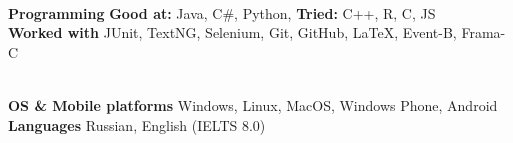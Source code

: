 


\vspace{.2cm}\begin{minipage}{.45\textwidth}
	\\{\fontsize{7pt}{1em}\bodyfont\bfseries\color{darktext}Programming}  {\fontsize{7pt}{1em}\bodyfontlight\color{text}\textbf{Good at:} Java, C\#, Python, \textbf{Tried:} C++, R, C, JS}
	\\{\fontsize{7pt}{1em}\bodyfont\bfseries\color{darktext}Worked with}  {\fontsize{7pt}{1em}\bodyfontlight\color{text}JUnit, TextNG, Selenium, Git, GitHub, LaTeX, Event-B, Frama-C}
\end{minipage} \quad
\begin{minipage}{.45\textwidth}
	\\{\fontsize{7pt}{1em}\bodyfont\bfseries\color{darktext}OS \& Mobile platforms}  {\fontsize{7pt}{1em}\bodyfontlight\color{text}Windows, Linux, MacOS, Windows Phone, Android
	}
	\\{\fontsize{7pt}{1em}\bodyfont\bfseries\color{darktext}Languages}  {\fontsize{7pt}{1em}\bodyfontlight\color{text}Russian, English (IELTS 8.0)}
\end{minipage}
